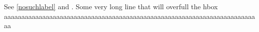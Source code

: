 \documentclass{article}
\begin{document}
See \ref{nosuchlabel} and \cite{nosuchcite}.
Some very long line that will overfull the hbox aaaaaaaaaaaaaaaaaaaaaaaaaaaaaaaaaaaaaaaaaaaaaaaaaaaaaaaaaaaaaaaaaaaaaaaaaa
\end{document}
